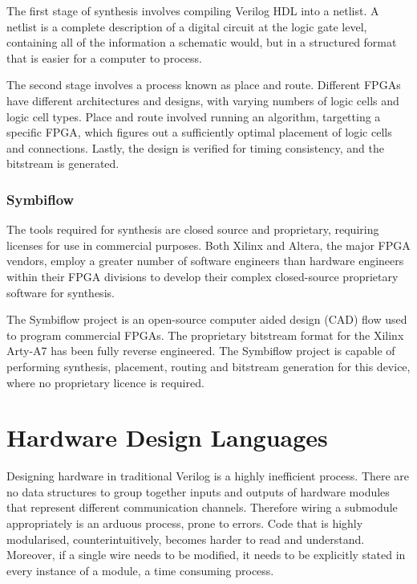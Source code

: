 \documentclass[a4paper,8pt]{report}
\begin{document}
The first stage of synthesis involves compiling Verilog HDL into a netlist.
A netlist is a complete description of a digital circuit at the logic gate
level, containing all of the information a schematic would, but in a structured
format that is easier for a computer to process.

The second stage involves a process known as place and route. Different FPGAs
have different architectures and designs, with varying numbers of logic cells
and logic cell types. Place and route involved running an algorithm, targetting
a specific FPGA, which figures out a sufficiently optimal placement of logic
cells and connections. Lastly, the design is verified for timing consistency,
and the bitstream is generated.

\subsubsection{Symbiflow}
The tools required for synthesis are closed source and proprietary, requiring
licenses for use in commercial purposes. Both Xilinx and Altera, the major FPGA
vendors, employ a greater number of software engineers than hardware engineers
within their FPGA divisions to develop their complex closed-source proprietary
software for synthesis.

The Symbiflow project is an open-source computer aided design (CAD) flow used to
program commercial FPGAs. The proprietary bitstream format for the Xilinx
Arty-A7 has been fully reverse engineered.
The Symbiflow project is capable of performing synthesis, placement, routing
and bitstream generation for this device, where no proprietary licence is required. 

\section{Hardware Design Languages}
Designing hardware in traditional Verilog is a highly inefficient process. There
are no data structures to group together inputs and outputs of hardware modules
that represent different communication channels. Therefore wiring a submodule
appropriately is an arduous process, prone to errors. Code that is highly
modularised, counterintuitively, becomes harder to read and understand.
Moreover, if a single wire needs to be modified, it needs to be explicitly
stated in every instance of a module, a time consuming process.
\end{document}
